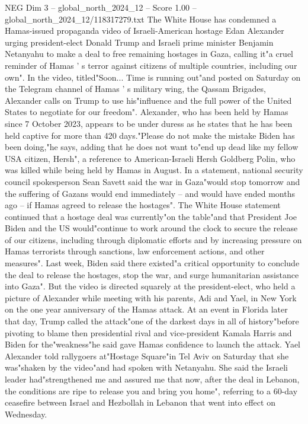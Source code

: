 \begin{textsample}{NEG Dim 3 – global\_north\_2024\_12 – Score 1.00 – global\_north\_2024\_12/118317279.txt}  \label{ex:f3_neg_243}
The White House has condemned a Hamas-issued propaganda video of Israeli-American hostage Edan Alexander urging president-elect Donald Trump and Israeli prime minister Benjamin Netanyahu to make a deal to free remaining hostages in Gaza, calling it"a cruel reminder of Hamas ' s terror against citizens of multiple countries, including our own".
In the video, titled"Soon...
Time is running out"and posted on Saturday on the Telegram channel of Hamas ' s military wing, the Qassam Brigades, Alexander calls on Trump to use his"influence and the full power of the United States to negotiate for our freedom".
Alexander, who has been held by Hamas since 7 October 2023, appears to be under duress as he states that he has been held captive for more than 420 days."Please do not make the mistake Biden has been doing,"he says, adding that he does not want to"end up dead like my fellow USA citizen, Hersh", a reference to American-Israeli Hersh Goldberg Polin, who was killed while being held by Hamas in August.
In a statement, national security council spokesperson Sean Savett said the war in Gaza"would stop tomorrow and the suffering of Gazans would end immediately -- and would have ended months ago -- if Hamas agreed to release the hostages".
The White House statement continued that a hostage deal was currently"on the table"and that President Joe Biden and the US would"continue to work around the clock to secure the release of our citizens, including through diplomatic efforts and by increasing pressure on Hamas terrorists through sanctions, law enforcement actions, and other measures".
Last week, Biden said there existed"a critical opportunity to conclude the deal to release the hostages, stop the war, and surge humanitarian assistance into Gaza".
But the video is directed squarely at the president-elect, who held a picture of Alexander while meeting with his parents, Adi and Yael, in New York on the one year anniversary of the Hamas attack.
At an event in Florida later that day, Trump called the attack"one of the darkest days in all of history"before pivoting to blame then presidential rival and vice-president Kamala Harris and Biden for the"weakness"he said gave Hamas confidence to launch the attack.
Yael Alexander told rallygoers at"Hostage Square"in Tel Aviv on Saturday that she was"shaken by the video"and had spoken with Netanyahu.
She said the Israeli leader had"strengthened me and assured me that now, after the deal in Lebanon, the conditions are ripe to release you and bring you home", referring to a 60-day ceasefire between Israel and Hezbollah in Lebanon that went into effect on Wednesday.

\end{textsample}
